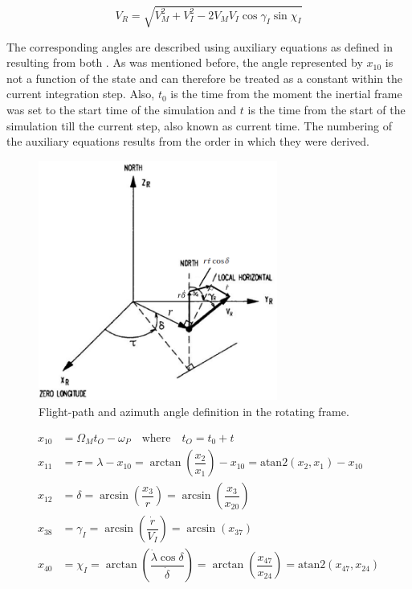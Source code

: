 \begin{equation} \label{eq:inVelToRotVel}
V_{R} = \sqrt{V_{M}^{2}+V_{I}^{2}-2V_{M}V_{I} \cos\gamma_{I} \sin\chi_{I}}
\end{equation} 
 
The corresponding angles are described using auxiliary equations as defined in  resulting from both . As was mentioned before, the angle represented by $x_{10}$ is not a function of the state and can therefore be treated as a constant within the current integration step. Also, $t_{0}$ is the time from the moment the inertial frame was set to the start time of the simulation and $t$ is the time from the start of the simulation till the current step, also known as current time. The numbering of the auxiliary equations results from the order in which they were derived.

 \begin{figure}[!ht]
\centering
\includegraphics[width=0.7\textwidth]{figures/tsi/flight_path_and_azimuth_angle.png}
\caption{Flight-path and azimuth angle definition in the rotating frame.}
\label{fig:flight_path_and_azimuth_angle}
\end{figure}
 
 \begin{equation} \label{eq:transAnglAux}
\begin{split}
x_{10} &= \Omega_{M}t_{O}-\omega_{P} \quad \text{where} \quad t_{O}=t_{0}+t \\
x_{11} &= \tau = \lambda - x_{10} = \arctan\left(\dfrac{x_{2}}{x_{1}}\right)-x_{10} = \text{atan2}\left(x_{2},x_{1}\right)-x_{10}\\
x_{12} &= \delta = \arcsin\left(\dfrac{x_{3}}{r}\right) = \arcsin\left(\dfrac{x_{3}}{x_{20}}\right)\\
x_{38} &= \gamma_{I} = \arcsin\left(\dfrac{\dot{r}}{V_{I}}\right) = \arcsin\left(x_{37}\right)\\
x_{40} &= \chi_{I} = \arctan\left(\dfrac{\dot{\lambda }\cos\delta}{\dot{\delta}}\right)=\arctan\left(\dfrac{x_{47}}{x_{24}}\right)=\text{atan2}\left(x_{47},x_{24}\right) \\
\end{split}
\end{equation} 

